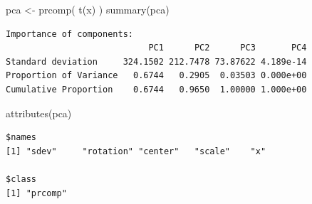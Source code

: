 \documentclass[
  letterpaper,
  DIV=11,
  numbers=noendperiod]{scrartcl}
\newenvironment{Shaded}{\begin{snugshade}}{\end{snugshade}}
\newcommand{\AttributeTok}[1]{\textcolor[rgb]{0.40,0.45,0.13}{#1}}
\newcommand{\CommentTok}[1]{\textcolor[rgb]{0.37,0.37,0.37}{#1}}
\newcommand{\DecValTok}[1]{\textcolor[rgb]{0.68,0.00,0.00}{#1}}
\newcommand{\FunctionTok}[1]{\textcolor[rgb]{0.28,0.35,0.67}{#1}}
\newcommand{\NormalTok}[1]{\textcolor[rgb]{0.00,0.23,0.31}{#1}}
\newcommand{\OtherTok}[1]{\textcolor[rgb]{0.00,0.23,0.31}{#1}}
\newcommand{\SpecialCharTok}[1]{\textcolor[rgb]{0.37,0.37,0.37}{#1}}
\newcommand{\StringTok}[1]{\textcolor[rgb]{0.13,0.47,0.30}{#1}}
\begin{document}
\begin{Shaded}
\begin{Highlighting}[]
\NormalTok{pca }\OtherTok{\textless{}{-}} \FunctionTok{prcomp}\NormalTok{( }\FunctionTok{t}\NormalTok{(x) )}
\FunctionTok{summary}\NormalTok{(pca)}
\end{Highlighting}
\end{Shaded}

\begin{verbatim}
Importance of components:
                            PC1      PC2      PC3       PC4
Standard deviation     324.1502 212.7478 73.87622 4.189e-14
Proportion of Variance   0.6744   0.2905  0.03503 0.000e+00
Cumulative Proportion    0.6744   0.9650  1.00000 1.000e+00
\end{verbatim}

\begin{Shaded}
\begin{Highlighting}[]
\FunctionTok{attributes}\NormalTok{(pca)}
\end{Highlighting}
\end{Shaded}

\begin{verbatim}
$names
[1] "sdev"     "rotation" "center"   "scale"    "x"       

$class
[1] "prcomp"
\end{verbatim}

\begin{Shaded}
\end{Shaded}
\end{document}
